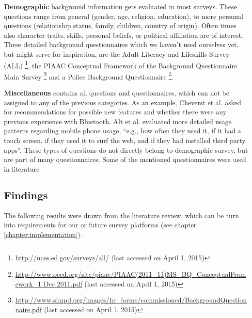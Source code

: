 	\textbf{Demographic} background information gets evaluated in most surveys. These questions range from general (gender, age, religion, education), to more personal questions (relationship status, family, children, country of origin). Often times also character traits, skills, personal beliefs, or political affiliation are of interest.
	Three detailed background questionnaires which we haven't used ourselves yet, but might serve for inspiration, are the Adult Literacy and Lifeskills Survey (ALL) \footnote{\url{http://nces.ed.gov/surveys/all/} (last accessed on April 1, 2015)}, the PIAAC Conceptual Framework of the Background Questionnaire Main Survey \footnote{\url{http://www.oecd.org/site/piaac/PIAAC(2011_11)MS_BQ_ConceptualFramework_1 Dec 2011.pdf} (last accessed on April 1, 2015)} and a Police Background Questionnaire \footnote{\url{http://www.slmpd.org/images/hr_forms/commissioned/BackgroundQuestionnaire.pdf} (last accessed on April 1, 2015)}.

	\textbf{Miscellaneous} contains all questions and questionnaires, which can not be assigned to any of the previous categories. As an example, Cheverst et al. \cite{cheverst2005hermes} asked for recommendations for possible new features and whether there were any previous experience with Bluetooth. Alt et al. \cite{alt2011digifieds} evaluated more detailed usage patterns regarding mobile phone usage, ``e.g., how often they used it, if it had a touch screen, if they used it to surf the web, and if they had installed third party apps''. These types of questions do not directly belong to demographic survey, but are part of many questionnaires. Some of the mentioned questionnaires were used in literature \cite{Huang2004, jacucci2010worldsofinformation, ojala2010ubi}








\subsection{Findings}
\label{section:questionnaires:findings}

	The following results were drawn from the literature review, which can be turn into requirements for our or future survey platforms (see chapter \ref{chapter:implementation}).


